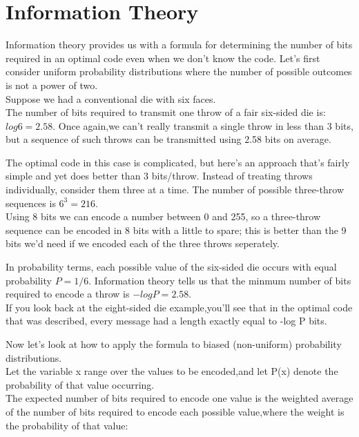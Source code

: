 \section{Information Theory}
\begin{frame}
Information theory provides us with a formula for determining the number of bits required in an optimal code even when we don't know the code. Let's first consider uniform probability distributions where the number of possible outcomes is not a power of two. \\Suppose we had a conventional die with six faces.\\ The number of bits required to transmit one throw of a fair six-sided die is:$ log 6 = 2.58$. Once again,we can't really transmit a single throw in less than 3 bits, but a sequence of such throws can be transmitted using 2.58 bits on average. 
\end{frame}
\begin{frame}
\large
The optimal code in this case is complicated, but here's an approach that's fairly simple and yet does better than 3 bits/throw. Instead of treating throws individually, consider them three at a time. The number of possible three-throw sequences is $6^3= 216$. \\Using 8 bits we can encode a number between 0 and 255, so a three-throw sequence can be encoded in 8 bits with a little to spare; this is better than the 9 bits we'd need if we encoded each of the three throws seperately.
\end{frame}
\begin{frame}
\large
In probability terms, each possible value of the six-sided die occurs with equal probability $P=1/6$. Information theory tells us that the minmum number of bits required to encode a throw is $-log P = 2.58$.\\ If you look back at the eight-sided die example,you'll see that in the optimal code that was described, every message had a length exactly equal to -log P bits.
\end{frame}
\begin{frame}
\large Now let's look at how to apply the formula to biased (non-uniform) probability distributions.\\ Let the variable x range over the values to be encoded,and let P(x) denote the probability of that value occurring.\\ The expected number of bits required to encode one value is the weighted average of the number of bits required to encode each possible value,where the weight is the probability of that value: 
\end{frame}


